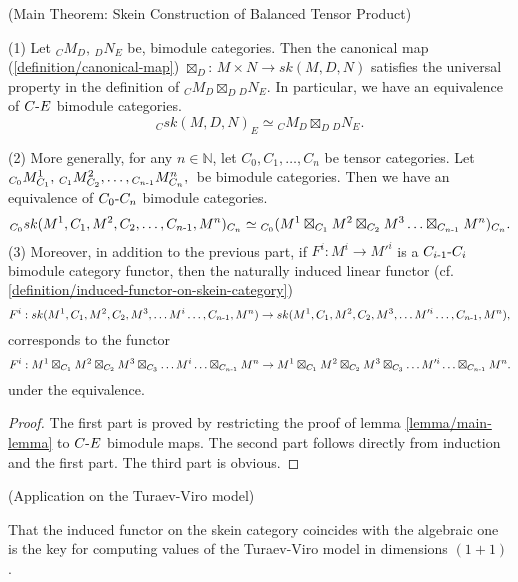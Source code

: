 \begin{theorem} (Main Theorem: Skein Construction of Balanced Tensor Product) \label{theorem/main-theorem}

  \noindent (1) Let ${}_{C}M_{D}, \, {}_{D}N_{E}$ be, bimodule categories.
  \quad Then the canonical map (\ref{definition/canonical-map})
  $\boxtimes_{D}$: $M \times N \to sk(M,D,N)$ satisfies the universal property
  in the definition of ${}_{C}M_{D} \boxtimes_{D} {}_{D}N_{E}$. In particular,
  we have an equivalence of $C{\text -}E$ bimodule categories.
  \[
    {}_{C}sk(M,D,N)_{E} \simeq {}_{C}M_{D} \boxtimes_{D} {}_{D}N_{E}.
  \]

  \noindent (2) More generally, for any $n \in \mathbb{N}$, let
  $C_{0}, C_{1}, \ldots, C_{n}$ be tensor categories. Let
  ${}_{C_{0}}M^{1}_{C_{1}}, \, {}_{C_{1}}M^{2}_{C_{2}}, \ldots, {}_{C_{n{\text -}1}}M^{n}_{C_{n}}, \, $
  be bimodule categories. \quad Then we have an equivalence of
  $C_{0}{\text -}C_{n}$ bimodule categories.
  \[
    {}_{C_{0}}sk(M^{1},C_{1},M^{2},C_{2}, \ldots, C_{n{\text -}1}, M^{n})_{C_{n}}
    \simeq
    {}_{C_{0}}(M^{1}
    \boxtimes_{C_{1}}
    M^{2}
    \boxtimes_{C_{2}}
    M^{3}
    \ldots
    \boxtimes_{C_{n{\text -}1}}
    M^{n})_{C_{n}}.
  \]
  \noindent (3) Moreover, in addition to the previous part, if
  $F^{i}: M^{i} \to M'^{i}$ is a $C_{i{\text -}1}{\text -}C_{i}$ bimodule category
  functor, then the naturally induced linear functor (cf.
  \ref{definition/induced-functor-on-skein-category})
  \[
    F^{i}:
    sk(M^{1}, C_{1}, M^{2}, C_{2}, M^{3}, \ldots M^{i} \ldots, C_{n{\text -}1}, M^{n})
    \to
    sk(M^{1}, C_{1}, M^{2}, C_{2}, M^{3}, \ldots M'^{i} \ldots, C_{n{\text -}1}, M^{n}),
  \]
  corresponds to the functor
  \[
    F^{i}: M^{1} \boxtimes_{C_{1}} M^{2} \boxtimes_{C_{2}} M^{3} \boxtimes_{C_{3}} \ldots M^{i} \ldots \boxtimes_{C_{n{\text -}1}} M^{n} \to M^{1} \boxtimes_{C_{1}} M^{2} \boxtimes_{C_{2}} M^{3} \boxtimes_{C_{3}} \ldots M'^{i} \ldots \boxtimes_{C_{n{\text -}1}} M^{n}.
  \]
  under the equivalence.
\end{theorem}

\begin{proof}
  The first part is proved by restricting the proof of lemma \ref{lemma/main-lemma} to $C{\text -}E$ bimodule maps.
  The second part follows directly from induction and the first part. The third part is obvious.
\end{proof}

\begin{remark} (Application on the Turaev-Viro model)

  \noindent That the induced functor on the skein category coincides with the
  algebraic one is the key for computing values of the Turaev-Viro model in
  dimensions $(1+1)$ \cite{guu/tv-as-3-functor}.
\end{remark}

